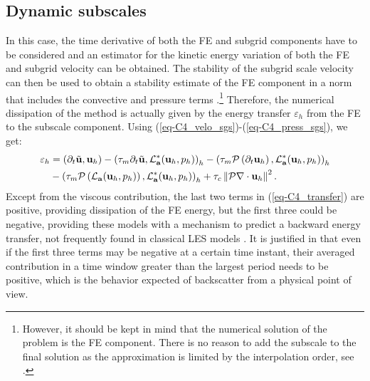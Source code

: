\subsection{Dynamic subscales} 

In this case, the time derivative of both the FE and subgrid components have to be considered and an estimator for the kinetic energy variation of both the FE and subgrid velocity can be obtained. The stability of the subgrid scale velocity can then be used to obtain a stability estimate of the FE component in a norm that includes the convective and pressure terms \cite{codina_time_2007,Badia2009a,Badia2010}.\footnote{However, it should be kept in mind that the numerical solution of the problem is the FE component. There is no reason to add the subscale to the final solution as the approximation is limited by the interpolation order, see \cite[Remark 10]{codina_time_2007}.} Therefore, the numerical dissipation of the method is actually given by the energy transfer $\varepsilon_h$ from the FE to the subscale component. 
Using (\ref{eq-C4_velo_sgs})-(\ref{eq-C4_press_sgs}), we get:
\begin{align}
\label{eq-C4_transfer}
\varepsilon_{h} & = 
  \left( \partial_t\tilde{\u} , \u_h\right) 
- \left( \tau_m \partial_t\tilde{\u} , \mathcal{L}^*_{\a} ( \u_{h},p_h)\right) _h 
- \left( \tau_{m} \mathcal{P} \left(  \partial_t \u_h \right), \mathcal{L}^*_{\a} ( \u_{h},p_h)\right)_h \\ \nonumber
& 
- \left( \tau_{m} \mathcal{P} \left(  \mathcal{L}_{\a} ( \u_{h},p_h) \right), \mathcal{L}^*_{\a} ( \u_{h},p_h) \right)_h
+ \tau_{c} \left\| \mathcal{P} \nabla \cdot \u_{h}\right\|^{2}. %
\end{align}
Except from the viscous contribution, the last two terms in (\ref{eq-C4_transfer}) are positive, providing dissipation of the FE energy, but the first three could be negative, providing these models with a mechanism to predict a backward energy transfer, not frequently found in classical LES models \cite{Sagaut2006}. It is justified in \cite{Codina-chap-2011} that even if the first three terms may be negative at a certain time instant, their averaged contribution in a time window greater than the largest period needs to be positive, which is the behavior expected of backscatter from a physical point of view. 

